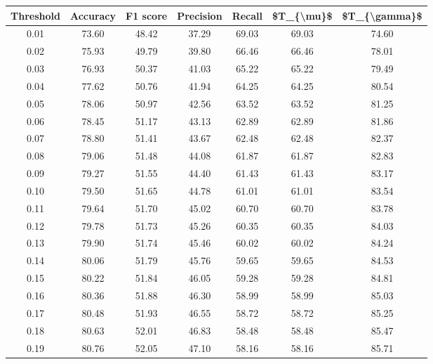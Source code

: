 \begin{tabular}{|c|c|c|c|c|c|c|}
\hline
 Threshold &  Accuracy &  F1 score &  Precision &  Recall &  \$T\_\{\textbackslash mu\}\$ &  \$T\_\{\textbackslash gamma\}\$ \\
\hline
      0.01 &     73.60 &     48.42 &      37.29 &   69.03 &      69.03 &         74.60 \\
      0.02 &     75.93 &     49.79 &      39.80 &   66.46 &      66.46 &         78.01 \\
      0.03 &     76.93 &     50.37 &      41.03 &   65.22 &      65.22 &         79.49 \\
      0.04 &     77.62 &     50.76 &      41.94 &   64.25 &      64.25 &         80.54 \\
      0.05 &     78.06 &     50.97 &      42.56 &   63.52 &      63.52 &         81.25 \\
      0.06 &     78.45 &     51.17 &      43.13 &   62.89 &      62.89 &         81.86 \\
      0.07 &     78.80 &     51.41 &      43.67 &   62.48 &      62.48 &         82.37 \\
      0.08 &     79.06 &     51.48 &      44.08 &   61.87 &      61.87 &         82.83 \\
      0.09 &     79.27 &     51.55 &      44.40 &   61.43 &      61.43 &         83.17 \\
      0.10 &     79.50 &     51.65 &      44.78 &   61.01 &      61.01 &         83.54 \\
      0.11 &     79.64 &     51.70 &      45.02 &   60.70 &      60.70 &         83.78 \\
      0.12 &     79.78 &     51.73 &      45.26 &   60.35 &      60.35 &         84.03 \\
      0.13 &     79.90 &     51.74 &      45.46 &   60.02 &      60.02 &         84.24 \\
      0.14 &     80.06 &     51.79 &      45.76 &   59.65 &      59.65 &         84.53 \\
      0.15 &     80.22 &     51.84 &      46.05 &   59.28 &      59.28 &         84.81 \\
      0.16 &     80.36 &     51.88 &      46.30 &   58.99 &      58.99 &         85.03 \\
      0.17 &     80.48 &     51.93 &      46.55 &   58.72 &      58.72 &         85.25 \\
      0.18 &     80.63 &     52.01 &      46.83 &   58.48 &      58.48 &         85.47 \\
      0.19 &     80.76 &     52.05 &      47.10 &   58.16 &      58.16 &         85.71 \\

\end{tabular}

